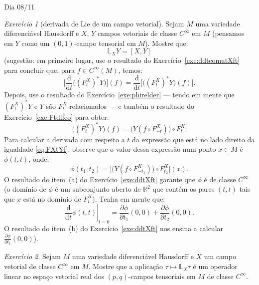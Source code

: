 \documentclass[oneside,11pt]{amsart}
\newcommand{\R}{\mathds R}
\newcommand{\dd}{\mathrm d}
\theoremstyle{remark}\newtheorem{exercise}{Exercício}[section]
\theoremstyle{plain}\newtheorem{teo}{Teorema}[section]
\theoremstyle{plain}\newtheorem{lem}[teo]{Lema}
\theoremstyle{plain}\newtheorem{prop}[teo]{Proposição}
\theoremstyle{definition}\newtheorem{defin}[teo]{Definição}
\theoremstyle{remark}\newtheorem{rem}[teo]{Observação}
\theoremstyle{definition}\newtheorem{example}[teo]{Exemplo}
\numberwithin{equation}{section}
\begin{document}
\begin{section}{Dia 08/11}
\begin{exercise}[derivada de Lie de um campo vetorial]\label{exe:derLievecfield}
Sejam $M$ uma variedade diferenciável Hausdorff e $X$, $Y$ campos vetoriais de classe $C^\infty$ em $M$ (pensamos em $Y$ como um $(0,1)$-campo tensorial
em $M$). Mostre que:
\[\mathbb L_XY=[X,Y]\]
(sugestão: em primeiro lugar, use o resultado do Exercício~\ref{exe:ddtcomutXft} para concluir que, para $f\in C^\infty(M)$, temos:
\[\Big[\frac{\dd}{\dd t}\big((F^X_t)^*Y\big)\Big](f)=\frac{\dd}{\dd t}\big[\big((F^X_t)^*Y\big)(f)\big].\]
Depois, use o resultado do Exercício~\ref{exe:phirelder} --- tendo em mente que $(F^X_t)^*Y$ e $Y$ são $F^X_t$-relacionados --- e também
o resultado do Exercício~\ref{exe:Ftdifeo} para obter:
\begin{equation}\label{eq:FXtYf}
\big((F^X_t)^*Y\big)(f)=\big(Y(f\circ F^X_{-t})\big)\circ F^X_t.
\end{equation}
Para calcular a derivada com respeito a $t$ da expressão que está no lado direito da igualdade \eqref{eq:FXtYf}, observe que o valor dessa expressão
num ponto $x\in M$ é $\phi(t,t)$, onde:
\[\phi(t_1,t_2)=\big[\big(Y(f\circ F^X_{-t_1})\big)\circ F^X_{t_2}\big](x).\]
O resultado do item~(a) do Exercício~\ref{exe:ddtXft} garante que $\phi$ é de classe $C^\infty$ (o domínio de $\phi$ é um subconjunto aberto de $\R^2$
que contém os pares $(t,t)$ tais que $x$ está no domínio de $F^X_t$).
Tenha em mente que:
\[\left.\frac{\dd}{\dd t}\phi(t,t)\right\vert_{t=0}=\frac{\partial\phi}{\partial t_1}(0,0)+\frac{\partial\phi}{\partial t_2}(0,0).\]
O resultado do item~(b) do Exercício~\ref{exe:ddtXft}
nos ensina a calcular $\frac{\partial\phi}{\partial t_1}(0,0)$).
\end{exercise}

\begin{exercise}\label{exe:Liederlint}
Sejam $M$ uma variedade diferenciável Hausdorff e $X$ um campo vetorial de classe $C^\infty$ em $M$. Mostre que a aplicação
$\tau\mapsto\mathbb L_X\tau$ é um operador linear no espaço vetorial real dos $(p,q)$-campos tensoriais em $M$ de classe $C^\infty$.
\end{exercise}


\end{section}
\end{document}
